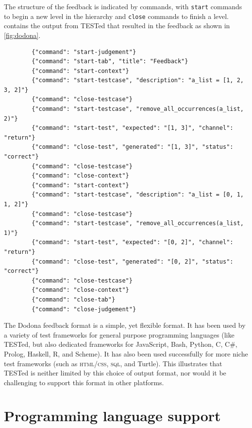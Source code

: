 \documentclass[../main]{subfiles}
\begin{document}
The structure of the feedback is indicated by commands, with \texttt{start} commands to begin a new level in the hierarchy and \texttt{close} commands to finish a level.
 contains the output from TESTed that resulted in the feedback as shown in \vref{fig:dodona}.

\begin{listing}
    \begin{verbatim}
        {"command": "start-judgement"}
        {"command": "start-tab", "title": "Feedback"}
        {"command": "start-context"}
        {"command": "start-testcase", "description": "a_list = [1, 2, 3, 2]"}
        {"command": "close-testcase"}
        {"command": "start-testcase", "remove_all_occurrences(a_list, 2)"}
        {"command": "start-test", "expected": "[1, 3]", "channel": "return"}
        {"command": "close-test", "generated": "[1, 3]", "status": "correct"}
        {"command": "close-testcase"}
        {"command": "close-context"}
        {"command": "start-context"}
        {"command": "start-testcase", "description": "a_list = [0, 1, 1, 2]"}
        {"command": "close-testcase"}
        {"command": "start-testcase", "remove_all_occurrences(a_list, 1)"}
        {"command": "start-test", "expected": "[0, 2]", "channel": "return"}
        {"command": "close-test", "generated": "[0, 2]", "status": "correct"}
        {"command": "close-testcase"}
        {"command": "close-context"}
        {"command": "close-tab"}
        {"command": "close-judgement"}
    \end{verbatim}
    \caption{
        Example of the output generated by TESTed, which is rendered in \vref{fig:dodona}.
        As before, each context consists of two testcases, the first of which has no tests, while the second has one test (the expected return value).
    }
    \label{lst:tested-output-example}
\end{listing}

The Dodona feedback format is a simple, yet flexible format.
It has been used by a variety of test frameworks for general purpose programming languages (like TESTed, but also dedicated frameworks for JavaScript, Bash, Python, C, C\#, Prolog, Haskell, R, and Scheme).
It has also been used successfully for more niche test frameworks (such as \textsc{html}/\textsc{css}, \textsc{sql}, and Turtle).
This illustrates that TESTed is neither limited by this choice of output format, nor would it be challenging to support this format in other platforms.

\section{Programming language support}\label{sec:programming-language-support}
\end{document}
